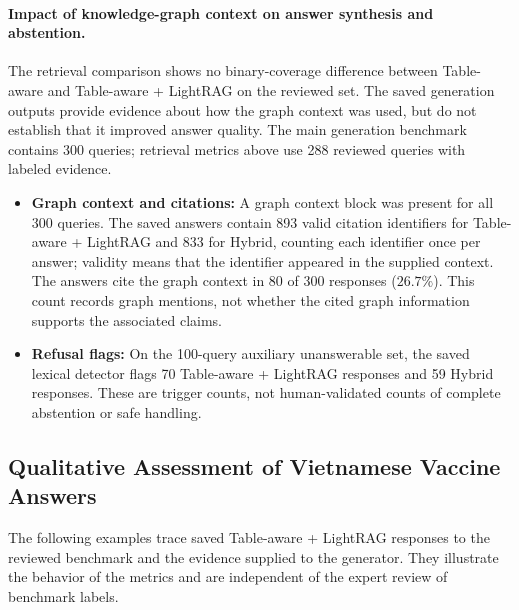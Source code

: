 \documentclass[sn-mathphys, oneside]{sn-jnl}
\begin{document}
\paragraph{Impact of knowledge-graph context on answer synthesis and abstention.}
The retrieval comparison shows no binary-coverage difference between Table-aware and Table-aware + LightRAG on the reviewed set. The saved generation outputs provide evidence about how the graph context was used, but do not establish that it improved answer quality. The main generation benchmark contains 300 queries; retrieval metrics above use 288 reviewed queries with labeled evidence.
\begin{itemize}
\item \textbf{Graph context and citations:} A graph context block was present for all 300 queries. The saved answers contain 893 valid citation identifiers for Table-aware + LightRAG and 833 for Hybrid, counting each identifier once per answer; validity means that the identifier appeared in the supplied context. The answers cite the graph context in 80 of 300 responses ($26.7\%$). This count records graph mentions, not whether the cited graph information supports the associated claims.
\item \textbf{Refusal flags:} On the 100-query auxiliary unanswerable set, the saved lexical detector flags 70 Table-aware + LightRAG responses and 59 Hybrid responses. These are trigger counts, not human-validated counts of complete abstention or safe handling.
\end{itemize}

\subsection{Qualitative Assessment of Vietnamese Vaccine Answers}
The following examples trace saved Table-aware + LightRAG responses to the reviewed benchmark and the evidence supplied to the generator. They illustrate the behavior of the metrics and are independent of the expert review of benchmark labels.
\end{document}
